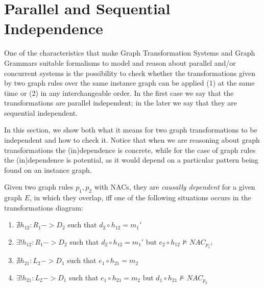 \begin{example}

\end{example}

\section{Parallel and Sequential Independence}

One of the characteristics that make Graph Transformation Systems and Graph Grammars suitable formalisms to model and reason about parallel and/or concurrent systems is the possibility to check whether the transformations given by two graph rules over the same instance graph can be applied (1) at the same time or (2) in any interchangeable order. In the first case we say that the transformations are parallel independent; in the later we say that they are sequential independent.

In this section, we show both what it means for two graph transformations to be independent and how to check it. Notice that when we are reasoning about graph transformations the (in)dependence is concrete, while for the case of graph rules the (in)dependence is potential, as it would depend on a particular pattern being found on an instance graph.

\begin{definition}\label{def:classic-dependency} Given two graph rules $p_1,p_2$ with NACs, they are \emph{causally dependent} for a given graph $E$, in which they overlap, iff one of the following situations occurs in the transformations diagram:

  \begin{enumerate}
    \item $\nexists h_{12} : R_1 -> D_2$ such that $d_2 \circ h_{12} = m_1'$
    \item $\exists! h_{12} : R_1 -> D_2$ such that $d_2 \circ h_{12} = m_1'$ but $e_2 \circ h_{12} \not\models NAC_{p_1^{-1}}$
    \item $\nexists h_{21} : L_2 -> D_1$ such that $e_1 \circ h_{21} = m_2$
    \item $\exists! h_{21} : L_2 -> D_1$ such that $e_1 \circ h_{21} = m_2$ but $d_1 \circ h_{21} \not\models NAC_{p_2}$
  \end{enumerate}

\end{definition}


